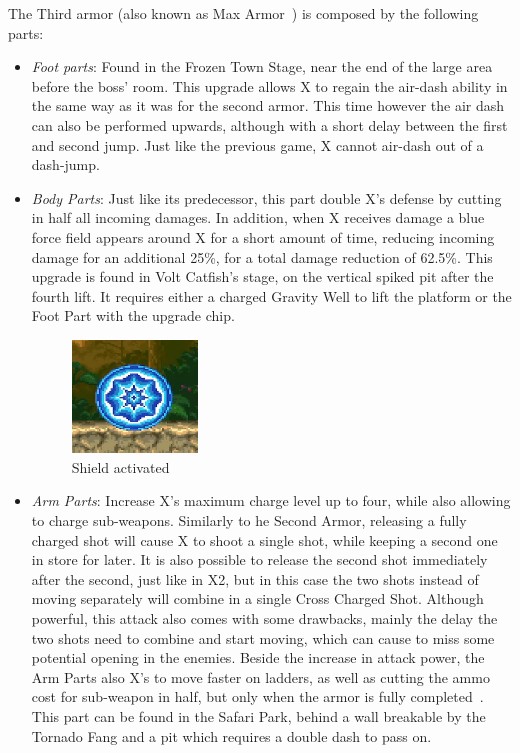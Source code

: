 The Third armor (also known as Max Armor~\cite{wiki:third_armor}) is composed by the following parts:
\begin{itemize}
	\item \emph{Foot parts}: Found in the Frozen Town Stage, near the end of the large area before the boss' room. This upgrade allows X to regain the air-dash ability in the same way as it was for the second armor. This time however the air dash can also be performed upwards, although with a short delay between the first and second jump. Just like the previous game, X cannot air-dash out of a dash-jump.
	
	
	\item \emph{Body Parts}: Just like its predecessor, this part double X's defense by cutting in half all incoming damages. In addition, when X receives damage a blue force field appears around X for a short amount of time, reducing incoming damage for an additional 25\%, for a total damage reduction of 62.5\%. This upgrade is found in Volt Catfish's stage, on the vertical spiked pit after the fourth lift. It requires either a charged Gravity Well to lift the platform or the Foot Part with the upgrade chip.
	
	\begin{figure}[htp]
		\centering
		\includegraphics[height=3cm]{figures/X3/weapons/Armor_shield.png}
		\caption{Shield activated}
	\end{figure}
	
	\item \emph{Arm Parts}: Increase X's maximum charge level up to four, while also allowing to charge sub-weapons. Similarly to he Second Armor, releasing a fully charged shot will cause X to shoot a single shot, while keeping a second one in store for later. It is also possible to release the second shot immediately after the second, just like in X2, but in this case the two shots instead of moving separately will combine in a single Cross Charged Shot. Although powerful, this attack also comes with some drawbacks, mainly the delay the two shots need to combine and start moving, which can cause to miss some potential opening in the enemies. 
	Beside the increase in attack power, the Arm Parts also X's to move faster on ladders, as well as cutting the ammo cost for sub-weapon in half, but only when the armor is fully completed~\cite{wiki:third_armor}. This part can be found in the Safari Park, behind a wall breakable by the Tornado Fang and a pit which requires a double dash to pass on.
		

\end{itemize}
